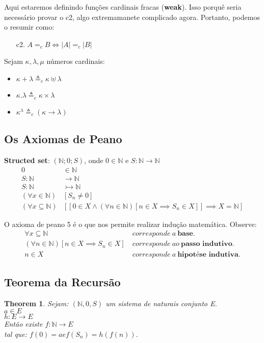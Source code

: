 \documentclass[12pt, a4paper]{article}
\newtheorem*{theorem}{Theorem}
\begin{document}
Aqui estaremos definindo funções cardinais fracas (\textbf{weak}). Isso porquê seria necessário provar o c2, algo extremamanete complicado agora. Portanto, podemos o resumir como:\\

\begin{itemize}
\item[c2.] $A =_c B \iff |A| =_c |B|$
\end{itemize}

Sejam $\kappa, \lambda, \mu$ números cardinais:
\begin{itemize}
\item $\kappa + \lambda \triangleq_c \kappa \uplus \lambda$
\item $\kappa . \lambda \triangleq_c \kappa \times \lambda$
\item $\kappa^\lambda \triangleq_c (\kappa \to \lambda)$
\end{itemize}

\subsection{Os Axiomas de Peano}
\textbf{Structed set}: $(\mathbb{N}; 0; S)$, onde $0 \in \mathbb{N}$ e $S:\mathbb{N} \rightarrow \mathbb{N}$\\

\begin{align*}
0 &\in \mathbb{N}\\
S: \mathbb{N} &\rightarrow \mathbb{N}\\
S: \mathbb{N} &\rightarrowtail \mathbb{N}\\
(\forall x \in \mathbb{N})&[S_n \neq 0 ]\\
(\forall x \subseteq \mathbb{N})&[ [0 \in X \land (\forall n \in \mathbb{N}) [n \in X \implies S_n \in X ]] \implies X = \mathbb{N}]
\end{align*}

O axioma de peano 5 é o que nos permite realizar indução matemática. Observe:
\begin{align*}
\forall x \subseteq \mathbb{N}~&corresponde~a~\textbf{base}.\\
(\forall n \in \mathbb{N}) [n \in X \implies S_n \in X] ~&corresponde~ao~\textbf{passo indutivo}.\\
n \in X ~&corresponde~a~\textbf{hipotése indutiva}.
\end{align*}

\subsection{Teorema da Recursão}
\label{sec:recursion}
\begin{theorem}
Sejam: $(\mathbb{N}, 0, S)$ um sistema de naturais conjunto E.\\
$a \in E$\\
$h:E \rightarrow E$\\
Então existe $f: \mathbb{N} \rightarrow E$\\
tal que: $f(0) = a e f(S_n) = h(f(n))$.
\end{theorem}
\end{document}

